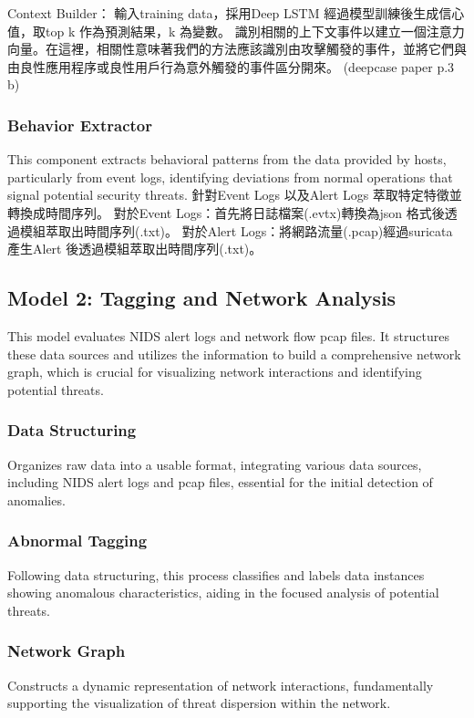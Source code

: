 Context Builder：
輸入training data，採用Deep LSTM 經過模型訓練後生成信心值，取top k 作為預測結果，k 為變數。
識別相關的上下文事件以建立一個注意力向量。在這裡，相關性意味著我們的方法應該識別由攻擊觸發的事件，並將它們與由良性應用程序或良性用戶行為意外觸發的事件區分開來。
(deepcase paper p.3 b)

\subsubsection{Behavior Extractor}
This component extracts behavioral patterns from the data provided by hosts, particularly from event logs, identifying deviations from normal operations that signal potential security threats.
針對Event Logs 以及Alert Logs 萃取特定特徵並轉換成時間序列。
對於Event Logs：首先將日誌檔案(.evtx)轉換為json 格式後透過模組萃取出時間序列(.txt)。
對於Alert Logs：將網路流量(.pcap)經過suricata 產生Alert 後透過模組萃取出時間序列(.txt)。

\subsection{Model 2: Tagging and Network Analysis}
This model evaluates NIDS alert logs and network flow pcap files. It structures these data sources and utilizes the information to build a comprehensive network graph, which is crucial for visualizing network interactions and identifying potential threats.

\subsubsection{Data Structuring}
Organizes raw data into a usable format, integrating various data sources, including NIDS alert logs and pcap files, essential for the initial detection of anomalies.

\subsubsection{Abnormal Tagging}
Following data structuring, this process classifies and labels data instances showing anomalous characteristics, aiding in the focused analysis of potential threats.

\subsubsection{Network Graph}
Constructs a dynamic representation of network interactions, fundamentally supporting the visualization of threat dispersion within the network.

